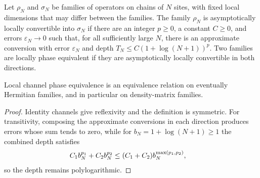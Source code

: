 \begin{definition}
    \label{def:qc_asymptotic_local_channel_conversion}
    \leanok
    Let $\rho_N$ and $\sigma_N$ be families of operators on chains of $N$
    sites, with fixed local dimensions that may differ between the families.
    The family $\rho_N$ is asymptotically locally convertible into $\sigma_N$
    if there are an integer $p\ge0$, a constant $C\ge0$, and errors
    $\varepsilon_N\to0$ such that, for all sufficiently large $N$, there
    is an approximate conversion with error $\varepsilon_N$ and depth
    $T_N\le C(1+\log(N+1))^p$. Two families are locally phase equivalent
    if they are asymptotically locally convertible in both directions.
\end{definition}

\begin{lemma}
    \label{thm:qc_local_channel_phase_equivalence}
    \leanok
    Local channel phase equivalence is an equivalence relation on eventually
    Hermitian families, and in particular on density-matrix families.
\end{lemma}
\begin{proof}
    \leanok
    Identity channels give reflexivity and the definition is symmetric.
    For transitivity, composing the approximate conversions in each direction
    produces errors whose sum tends to zero, while for
    $b_N=1+\log(N+1)\ge1$ the combined depth satisfies
    \begin{align}
        C_1b_N^{p_1}+C_2b_N^{p_2}
         & \le(C_1+C_2)b_N^{\max(p_1,p_2)}, \notag
    \end{align}
    so the depth remains polylogarithmic.
\end{proof}
